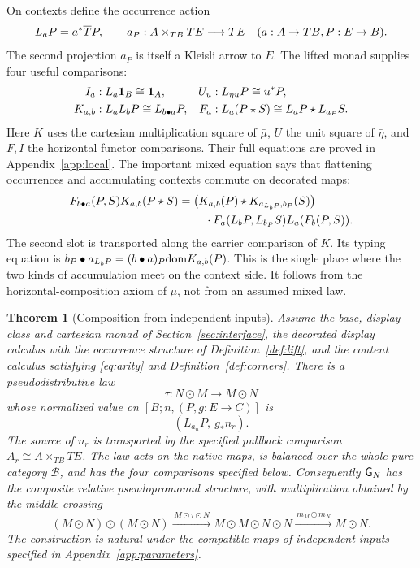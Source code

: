 \documentclass[11pt]{article}
\numberwithin{equation}{section}
\newtheorem{theorem}{Theorem}[section]
\theoremstyle{definition}\newtheorem{definition}[theorem]{Definition}
\newcommand{\B}{\mathcal B}\newcommand{\J}{\mathcal J}
\begin{document}
On contexts define the occurrence action
\begin{equation}\label{eq:L}
 L_aP=a^*\overline T P,
 \qquad a_P:A\times_{TB}TE\longrightarrow TE
 \quad(a:A\to TB, P:E\to B).
\end{equation}
The second projection $a_P$ is itself a Kleisli arrow to $E$. The lifted
monad supplies four useful comparisons:
\begin{align}
 I_a &:L_a\mathbf1_B\cong\mathbf1_A,&
 U_u &:L_{\eta u}P\cong u^*P,\label{eq:IU}\\
 K_{a,b}&:L_aL_bP\cong L_{b\bullet a}P,&
 F_a&:L_a(P\mathbin{\star} S)\cong L_aP\mathbin{\star} L_{a_P}S.\label{eq:KF}
\end{align}
Here $K$ uses the cartesian multiplication square of $\bar\mu$,
$U$ the unit square of $\bar\eta$, and $F,I$ the horizontal functor
comparisons. Their full equations are proved in Appendix~\ref{app:local}.
The important mixed equation says that flattening occurrences and
accumulating contexts commute on decorated maps:
\begin{align}
 F_{b\bullet a}(P,S)K_{a,b}(P\mathbin{\star} S)
 ={}&\bigl(K_{a,b}(P)\mathbin{\star} K_{a_{L_bP},b_P}(S)\bigr)\notag\\
 &\quad\cdot F_a(L_bP,L_{b_P}S)L_a(F_b(P,S)).\label{eq:middle}
\end{align}
The second slot is transported along the carrier comparison of $K$.
Its typing equation is
$b_P\bullet a_{L_bP}=(b\bullet a)_P\mathrm{dom} K_{a,b}(P)$.
This is the single place where the two kinds of accumulation meet on
the context side. It follows from the horizontal-composition axiom of
$\bar\mu$, not from an assumed mixed law.

\begin{theorem}[Composition from independent inputs]\label{thm:glue}
Assume the base, display class and cartesian monad of
Section~\ref{sec:interface}, the decorated display calculus with the
occurrence structure of Definition~\ref{def:lift}, and the content
calculus satisfying \eqref{eq:arity} and Definition~\ref{def:corners}.
There is a pseudodistributive law
\[
                    \tau:N\odot M\longrightarrow M\odot N
\]
whose normalized value on $[B;n,(P,g:E\to C)]$ is
\begin{equation}\label{eq:cross}
                         (L_{a_n}P,\ g_*n_r).
\end{equation}
The source of $n_r$ is transported by the specified pullback comparison
$A_r\cong A\times_{TB}TE$. The law acts on the native maps, is balanced
over the whole pure category $\B$, and has the four comparisons specified
below. Consequently $\mathsf G_N$ has the composite relative pseudopromonad
structure, with multiplication obtained by the middle crossing
\[
 (M\odot N)\odot(M\odot N)
 \xrightarrow{\,M\odot\tau\odot N\,}
 M\odot M\odot N\odot N
 \xrightarrow{\,m_M\odot m_N\,}M\odot N.
\]
The construction is natural under the compatible maps of independent
inputs specified in Appendix~\ref{app:parameters}.
\end{theorem}
\end{document}
